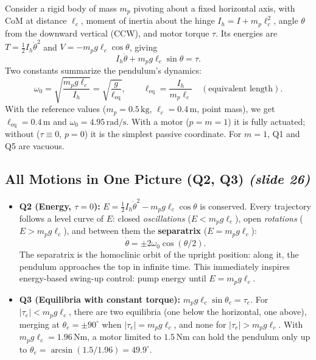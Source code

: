 \documentclass[11pt, a4paper]{article}
\theoremstyle{definition}
\theoremstyle{plain}
\begin{document}
Consider a rigid body of mass $m_p$ pivoting about a fixed horizontal axis, with CoM at distance $\ell_c$, moment of inertia about the hinge $I_h = I + m_p \ell_c^2$, angle $\theta$ from the downward vertical (CCW), and motor torque $\tau$. Its energies are $T = \frac{1}{2} I_h \dot{\theta}^2$ and $V = -m_p g \ell_c \cos\theta$, giving
\begin{equation}
  I_h \ddot{\theta} + m_p g \ell_c \sin\theta = \tau.
  \label{eq:pendulum}
\end{equation}
Two constants summarize the pendulum's dynamics:
\[
  \omega_0 = \sqrt{\frac{m_p g \ell_c}{I_h}} = \sqrt{\frac{g}{\ell_{\text{eq}}}}, \qquad
  \ell_{\text{eq}} = \frac{I_h}{m_p \ell_c} \quad (\text{equivalent length}).
\]
With the reference values ($m_p = 0.5\,\mathrm{kg}$, $\ell_c = 0.4\,\mathrm{m}$, point mass), we get $\ell_{\text{eq}} = 0.4\,\mathrm{m}$ and $\omega_0 = 4.95\,\mathrm{rad/s}$. With a motor ($p=m=1$) it is fully actuated; without ($\tau \equiv 0$, $p=0$) it is the simplest passive coordinate. For $m=1$, Q1 and Q5 are vacuous.

\subsection{All Motions in One Picture (Q2, Q3) \emph{(slide 26)}}

\begin{itemize}
  \item \textbf{Q2 (Energy, $\tau=0$):} $E = \frac{1}{2}I_h \dot{\theta}^2 - m_p g \ell_c \cos\theta$ is conserved. Every trajectory follows a level curve of $E$: closed \emph{oscillations} ($E < m_p g \ell_c$), open \emph{rotations} ($E > m_p g \ell_c$), and between them the \textbf{separatrix} ($E = m_p g \ell_c$):
  \[
    \dot{\theta} = \pm 2\omega_0 \cos(\theta / 2).
  \]
  The separatrix is the homoclinic orbit of the upright position: along it, the pendulum approaches the top in infinite time. This immediately inspires energy-based swing-up control: pump energy until $E = m_p g \ell_c$.
  \item \textbf{Q3 (Equilibria with constant torque):} $m_p g \ell_c \sin\theta_e = \tau_e$. For $|\tau_e| < m_p g \ell_c$, there are two equilibria (one below the horizontal, one above), merging at $\theta_e = \pm 90^\circ$ when $|\tau_e| = m_p g \ell_c$, and none for $|\tau_e| > m_p g \ell_c$. With $m_p g \ell_c = 1.96\,\mathrm{Nm}$, a motor limited to $1.5\,\mathrm{Nm}$ can hold the pendulum only up to $\theta_e = \arcsin(1.5/1.96) = 49.9^\circ$.
\end{itemize}
\end{document}
